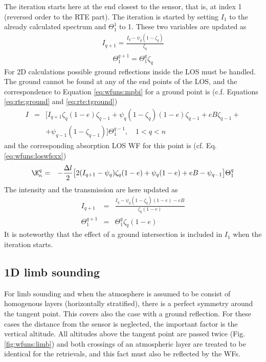  The iteration starts here at the end closest to the
 sensor, that is, at index 1 (reversed order to the RTE part).  The
 iteration is started by setting $I_1$ to the already calculated
 spectrum and $\Theta^1_1$ to 1.  These two variables are updated as
 \begin{eqnarray}
   I_{q+1} = \frac{I_q - \psi_q(1-\zeta_q)}{\zeta_q} 
 \end{eqnarray}
 \begin{eqnarray}
   \Theta_1^{q+1} =  \Theta_1^q \zeta_q
 \end{eqnarray}
 For 2D calculations possible ground reflections inside the LOS must
 be handled. The ground cannot be found at any of the end points of
 the LOS, and the correspondence to Equation \ref{eq:wfuns:mpbi} for a
 ground point is (c.f. Equations \ref{eq:rte:ground} and
 \ref{eq:rte:tground})
 \begin{eqnarray}
   I &=&\Big[I_{q+1}\zeta_q(1-e)\zeta_{q-1}+\psi_q(1-\zeta_q)(1-e)\zeta_{q-1}
          +eB\zeta_{q-1}+ \nonumber \\
     & & + \psi_{q-1}(1-\zeta_{q-1}) \Big] \Theta^{q-1}_1, \quad 1<q<n 
    \label{eq:wfuns:mpbi_ground}
 \end{eqnarray}
 and the corresponding absorption LOS WF for this point is (cf. Eq.
 \ref{eq:wfuns:loswfsxx})
 \begin{eqnarray}
   \K_{\kappa}^q &=& -\frac{\Delta l}{2} \big[ 2(I_{q+1}-\psi_q)\zeta_q(1-e)+
           \psi_q(1-e)+eB-\psi_{q-1} \big] \Theta^q_1 
 \end{eqnarray}
 The intensity and the transmission are here updated as
 \begin{eqnarray}
   I_{q+1} &=& \frac{I_q-\psi_q(1-\zeta_q)(1-e)-eB}{\zeta_q(1-e)}  \nonumber \\
   \Theta_1^{q+1} &=& \Theta_1^{q}\zeta_q(1-e) \nonumber
 \end{eqnarray}
 It is noteworthy that the effect of a ground intersection is included
 in $I_1$ when the iteration starts.  


 
 \subsection{1D limb sounding}
 \label{sec:wfuns:limb}
    
 For limb sounding and when the atmosphere is assumed to be consist of
 homogenous layers (horizontally stratified), there is a perfect
 symmetry around the tangent point. This covers also the case with a
 ground reflection. For these cases the distance from the sensor is
 neglected, the important factor is the vertical altitude.  All
 altitudes above the tangent point are passed twice (Fig.
 \ref{fig:wfuns:limb}) and both crossings of an atmospheric layer are
 treated to be identical for the retrievals, and this fact must also
 be reflected by the WFs.

